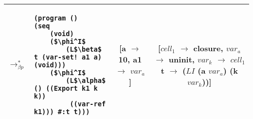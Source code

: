 \begin{table}[!htbp]
\begin{tabular}{l >{\centering\arraybackslash}m{} >{\scriptsize}c >{\scriptsize}c}
	$\longrightarrow_{\beta p}^*$&\begin{lstlisting}[style=numberless]
(program ()
(seq
	(void)
	($\phi^I$
		(L$\beta$ t (var-set! a1 a) (void)))
	($\phi^I$
		(L$\alpha$ () ((Export k1 k k))
		 ((var-ref k1))) #:t t)))\end{lstlisting} & \thead{[a $\rightarrow$ 10,\\a1 $\rightarrow$ $var_a$]} & \thead{[$cell_1$ $\rightarrow$ closure,\\$var_a$ $\rightarrow$ uninit,\\$var_k$ $\rightarrow$ $cell_1$\\t $\rightarrow$ ($LI$\\(a $var_a$) (k $var_k$))]} \\ \hline
  \end{tabular}
\end{table}

\clearpage

